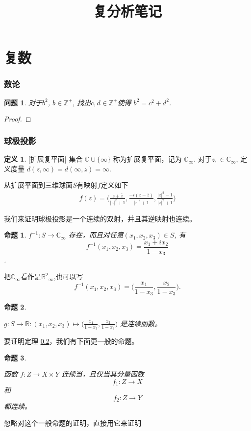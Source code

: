 \documentclass[font=windows]{ctexart}
\title{复分析笔记}
\newtheorem{question}{问题} %
\newtheorem{prop}{命题}[section]
\theoremstyle{definition}
\newtheorem{Definition}{定义}[section]
\begin{document}
\tableofcontents 

\part{复数}
\section*{数论}
\begin{question} 对于$b^2$, $b\in \mathbb{Z^{+}}$, 找出$c,d\in \mathbb{Z}^{+}$使得 $b^2=c^2+d^2$. 
 \end{question}
\begin{proof}  \end{proof}
\section*{球极投影}
\begin{Definition}{}[扩展复平面] 集合
    \(\mathbb{C}\cup \{\infty \}\) 称为扩展复平面，记为
    \(\mathbb{C}_{\infty}\). 对于$z,\in \mathbb{C}_{\infty}$, 定义度量 \(d(z,\infty)=d(\infty,z)=\infty\).  
\end{Definition}
从扩展平面到三维球面\(S\)有映射\(f\)定义如下
\begin{align}
    f(z)=\bigg(\frac{z+\bar{z}}{|z|^2+1} , \frac{-i(z-\bar{z})}{|z|^2+1}, \frac{|z|^2-1}{|z|^2+1}\bigg)
\end{align}


我们来证明球极投影是一个连续的双射，并且其逆映射也连续。

\begin{prop}{}
    \(f^{-1}\colon S\to \mathbb{C}_{\infty}\) 存在，而且对任意\((x_1,x_2,x_3)\in S\), 有\[f^{-1}(x_1,x_2,x_3)=\frac{x_1+ix_2}{1-x_3}\]. 
\end{prop}
把\(\mathbb{C}_{\infty}\)看作是\(\mathbb{R^2}_{\infty}\),也可以写 \[ f^{-1}(x_1,x_2,x_3)=\bigl( \frac{x_1}{1-x_3},\frac{x_2}{1-x_3} \bigl). \]
\begin{prop}\hypertarget{02}{}
    \(g\colon S\to \mathbb{R}\colon (x_1,x_2,x_3) \mapsto \bigl( \frac{x_1}{1-x_3},\frac{x_2}{1-x_3} \bigl) \) 是连续函数。
    
\end{prop}   
要证明定理 \hyperlink{02}{0.2}，我们有下面更一般的命题。
\begin{prop}\hypertarget{03}{}
    函数 \(f\colon Z\to X\times Y\) 连续当，且仅当其分量函数\[f_1\colon Z\to X\] 和 \[f_2\colon Z\to Y\] 都连续。 
\end{prop}
忽略对这个一般命题的证明，直接用它来证明
\end{document}
